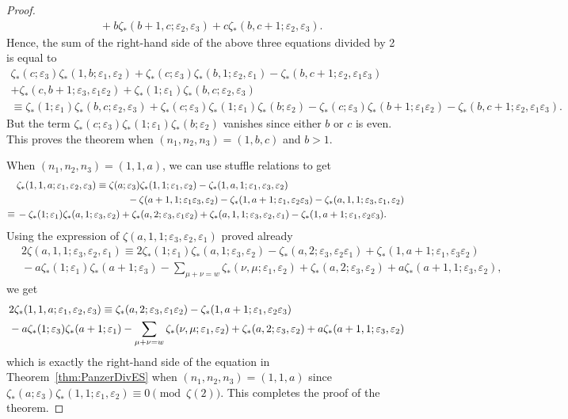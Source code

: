 \documentclass{article}
\newcommand\eps{{\varepsilon}}
\theoremstyle{plain}
\theoremstyle{definition}
\begin{document}
\begin{proof}
\begin{align*}
&\, +b\zeta_*(b+1,c;\eps_2,\eps_3)+c\zeta_*(b,c+1;\eps_2,\eps_3) .
\end{align*}
Hence, the sum of the right-hand side of the above three equations divided by 2 is equal to
\begin{multline*}
 \zeta_*(c;\eps_3)\zeta_*(1,b;\eps_1,\eps_2)
 +\zeta_*(c;\eps_3)\zeta_*(b,1;\eps_2,\eps_1)-\zeta_*(b,c+1;\eps_2,\eps_1\eps_3) \\
   +\zeta_*(c,b+1;\eps_3,\eps_1\eps_2)+\zeta_*(1;\eps_1)\zeta_*(b,c;\eps_2,\eps_3) \\
\equiv   \zeta_*(1;\eps_1)\zeta_*(b,c;\eps_2,\eps_3)+ \zeta_*(c;\eps_3)\zeta_*(1;\eps_1)\zeta_*(b;\eps_2)- \zeta_*(c;\eps_3)\zeta_*(b+1;\eps_1\eps_2)-\zeta_*(b,c+1;\eps_2,\eps_1\eps_3).
\end{multline*}
But the term $\zeta_*(c;\eps_3)\zeta_*(1;\eps_1)\zeta_*(b;\eps_2)$ vanishes since either $b$ or $c$ is even. This proves the theorem when $(n_1,n_2,n_3)=(1,b,c)$ and $b>1$.


When $(n_1,n_2,n_3)=(1,1,a)$, we can use stuffle relations to get
\begin{align*}
 &\, \zeta_*(1,1,a;\eps_1,\eps_2,\eps_3)\equiv
\zeta(a;\eps_3)\zeta_*(1,1;\eps_1,\eps_2)-\zeta_*(1,a,1;\eps_1,\eps_3,\eps_2)\\
&\, \hskip4cm -\zeta(a+1,1;\eps_1\eps_3,\eps_2)-\zeta_*(1,a+1;\eps_1,\eps_2\eps_3)-\zeta_*(a,1,1;\eps_3,\eps_1,\eps_2)\\
\equiv &\, -\zeta_*(1;\eps_1)\zeta_*(a,1;\eps_3,\eps_2)
+\zeta_*(a,2;\eps_3,\eps_1\eps_2) +\zeta_*(a,1,1;\eps_3,\eps_2,\eps_1)
-\zeta_*(1,a+1;\eps_1,\eps_2\eps_3).
\end{align*}
Using the expression of $\zeta(a,1,1;\eps_3,\eps_2,\eps_1)$ proved already
\begin{align*}
 &\,  2 \zeta(a,1,1;\eps_3,\eps_2,\eps_1)
\equiv 2\zeta_*(1;\eps_1)\zeta_*(a,1;\eps_3,\eps_2)-\zeta_*(a,2;\eps_3,\eps_2\eps_1)+\zeta_*(1,a+1;\eps_1,\eps_3\eps_2) \\
&\, -a \zeta_*(1;\eps_1) \zeta_*(a+1;\eps_3)
 -\sum_{\mu+\nu=w}   \zeta_*(\nu,\mu;\eps_1,\eps_2)
+\zeta_*(a,2;\eps_3,\eps_2)  +a\zeta_*(a+1,1;\eps_3,\eps_2),
\end{align*}
we get
\begin{align}
&\, 2\zeta_*(1,1,a;\eps_1,\eps_2,\eps_3)
\equiv \zeta_*(a,2;\eps_3,\eps_1\eps_2)
-\zeta_*(1,a+1;\eps_1,\eps_2\eps_3) \notag\\
&\, -a \zeta_*(1;\eps_3) \zeta_*(a+1;\eps_1)
 -\sum_{\mu+\nu=w}   \zeta_*(\nu,\mu;\eps_1,\eps_2)
+\zeta_*(a,2;\eps_3,\eps_2)  +a\zeta_*(a+1,1;\eps_3,\eps_2)   \label{equ:zeta(1,1,a)}
\end{align}
which is exactly the right-hand side of the equation in Theorem~\ref{thm:PanzerDivES} when $(n_1,n_2,n_3)=(1,1,a)$
since $\zeta_*(a;\eps_3)\zeta_*(1,1;\eps_1,\eps_2)\equiv 0 \pmod{\zeta(2)}$.
This completes the proof of the theorem.
\end{proof}
\end{document}
